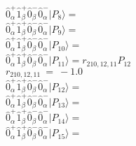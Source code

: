 \documentclass[14pt]{article}
\begin{document}
    $ \hat{0}_{\alpha}^{+}\hat{1}_{\beta}^{+}\hat{0}_{\beta}^{-}\hat{0}_{\alpha}^{-} \vert{P_{8}}\rangle =  $ \\ 
    $ \hat{0}_{\alpha}^{+}\hat{1}_{\beta}^{+}\hat{0}_{\beta}^{-}\hat{0}_{\alpha}^{-} \vert{P_{9}}\rangle =  $ \\ 
    $ \hat{0}_{\alpha}^{+}\hat{1}_{\beta}^{+}\hat{0}_{\beta}^{-}\hat{0}_{\alpha}^{-} \vert{P_{10}}\rangle =  $ \\ 
    $ \hat{0}_{\alpha}^{+}\hat{1}_{\beta}^{+}\hat{0}_{\beta}^{-}\hat{0}_{\alpha}^{-} \vert{P_{11}}\rangle = {r}_{210,12,11}P_{12} $ \\ 
    ${r}_{210,12,11}\ =\ -1.0 $ \\ 
    $ \hat{0}_{\alpha}^{+}\hat{1}_{\beta}^{+}\hat{0}_{\beta}^{-}\hat{0}_{\alpha}^{-} \vert{P_{12}}\rangle =  $ \\ 
    $ \hat{0}_{\alpha}^{+}\hat{1}_{\beta}^{+}\hat{0}_{\beta}^{-}\hat{0}_{\alpha}^{-} \vert{P_{13}}\rangle =  $ \\ 
    $ \hat{0}_{\alpha}^{+}\hat{1}_{\beta}^{+}\hat{0}_{\beta}^{-}\hat{0}_{\alpha}^{-} \vert{P_{14}}\rangle =  $ \\ 
    $ \hat{0}_{\alpha}^{+}\hat{1}_{\beta}^{+}\hat{0}_{\beta}^{-}\hat{0}_{\alpha}^{-} \vert{P_{15}}\rangle =  $ \\ 
    
\end{document}
